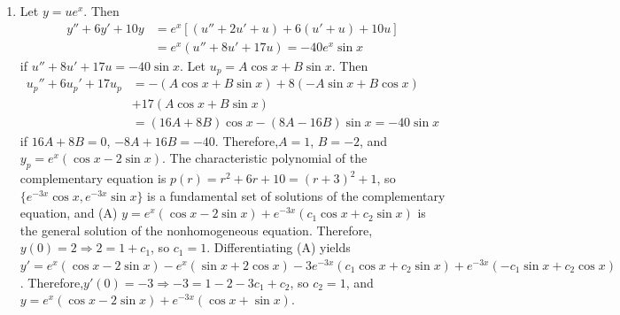 \documentclass[openany]{book}
\newenvironment{sectionSolutions}{
 \begin{enumerate}[item-label={\thesection.\arabic{enumi}.}]
}{
 \end{enumerate}
}
\begin{document}
\begin{sectionSolutions}
\item
Let $y=ue^x$. Then
\begin{align*}
y''+6y'+10y&=e^x\left[(u''+2u'+u)+6(u'+u)+10u\right]\\
&=e^x(u''+8u'+17u)=
-40e^x\sin x
\end{align*}
 if  $u''+8u'+17u=-40\sin x$.
Let $u_p=A\cos x+B\sin x$. Then
\begin{align*}
u_p''+6u_p'+17u_p&=-(A\cos x+B\sin x)+8(-A\sin x+B\cos x)\\
&+17(A\cos x+B\sin x)\\
&=(16A+8B)\cos x-(8A-16B)\sin x=-40\sin x
\end{align*}
if $16A+8B=0$, $-8A+16B=-40$. Therefore,$A=1$, $B=-2$, and
$y_p=e^x(\cos x-2\sin x)$. The characteristic polynomial of the
complementary equation is $p(r)=r^2+6r+10=(r+3)^2+1$, so
$\{e^{-3x}\cos x,e^{-3x}\sin x\}$ is a fundamental set of solutions
of the complementary equation, and (A) $y=e^x(\cos x-2\sin
x)+e^{-3x}(c_1\cos x+c_2\sin x)$ is the general solution of the
nonhomogeneous equation. Therefore,$y(0)=2\Rightarrow 2=1+c_1$, so
$c_1=1$. Differentiating (A) yields $y'=e^x(\cos x-2\sin x)-e^x(\sin
x+2\cos x) -3e^{-3x}(c_1\cos x+c_2\sin x) +e^{-3x}(-c_1\sin x+c_2\cos
x)$. Therefore,$y'(0)=-3\Rightarrow -3=1-2-3c_1+c_2$, so $c_2=1$, and
$y=e^x(\cos x-2\sin x)+e^{-3x}(\cos x+\sin x)$.



\end{sectionSolutions}
\end{document}
